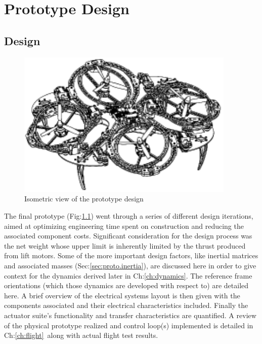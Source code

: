 \chapter{Prototype Design}
\label{ch:proto}
\section{Design}
\label{sec:proto.design}
\begin{figure}[htbp]
\centering
\includegraphics[width=0.93\textwidth]{figs/iso-design}
\caption{Isometric view of the prototype design}
\label{fig:iso-design}
\end{figure}
The final prototype (Fig:\ref{fig:iso-design}) went through a series of different design iterations, aimed at optimizing engineering time spent on construction and reducing the associated component costs. Significant consideration for the design process was the net weight whose upper limit is inherently limited by the thrust produced from lift motors. Some of the more important design factors, like inertial matrices and associated masses (Sec:\ref{sec:proto.inertia}), are discussed here in order to give context for the dynamics derived later in Ch:\ref{ch:dynamics}. The reference frame orientations (which those dynamics are developed with respect to) are detailed here. A brief overview of the electrical systems layout is then given with the components associated and their electrical characteristics included. Finally the actuator suite's functionality and transfer characteristics are quantified. A review of the physical prototype realized and control loop(s) implemented is detailed in Ch:\ref{ch:flight}~along with actual flight test results.
